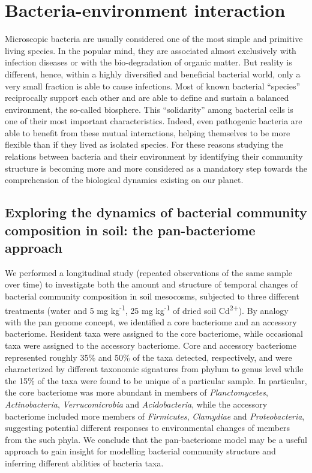 
\logvartrue
\chapter{Bacteria-environment interaction}
Microscopic bacteria are usually considered one of the most simple and primitive living species. In the popular mind, they are associated almost exclusively with infection diseases or with the bio-degradation of organic matter. But reality is different, hence, within a highly diversified and beneficial bacterial world, only a very small fraction is able to cause infections. Most of known bacterial ``species'' reciprocally support each other and are able to define and sustain a balanced environment, the so-called biosphere. This ``solidarity'' among bacterial cells is one of their  most important characteristics. Indeed, even pathogenic bacteria are able to benefit from these mutual interactions, helping themselves to be more flexible than if they lived as isolated species. For these reasons studying the relations between bacteria and their environment by identifying their community structure is becoming more and more considered as a mandatory step towards the comprehension of the biological dynamics existing on our planet.\\

\section{Exploring the dynamics of bacterial community composition in soil: the pan-bacteriome approach}
We performed a longitudinal study (repeated observations of the same sample over time) to investigate both the amount and structure of temporal changes of bacterial community composition in soil mesocosms, subjected to three different treatments (water and 5 mg kg\textsuperscript{-1}, 25 mg kg\textsuperscript{-1} of dried soil Cd\textsuperscript{2+}). By analogy with the pan genome concept, we identified a core bacteriome and an accessory bacteriome. Resident taxa were assigned to the core bacteriome, while occasional taxa were assigned to the accessory bacteriome. Core and accessory bacteriome represented roughly 35\% and 50\% of the taxa detected, respectively, and were characterized by different taxonomic signatures from phylum to genus level while the 15\% of the taxa were found to be unique of a particular sample. In particular, the core bacteriome was more abundant in members of \textit{Planctomycetes}, \textit{Actinobacteria}, \textit{Verrucomicrobia} and \textit{Acidobacteria}, while the accessory bacteriome included more members of \textit{Firmicutes}, \textit{Clamydiae} and \textit{Proteobacteria}, suggesting potential different responses to environmental changes of members from the such phyla. We conclude that the pan-bacteriome model may be a useful approach to gain insight for modelling bacterial community structure and inferring different abilities of bacteria taxa.\\

